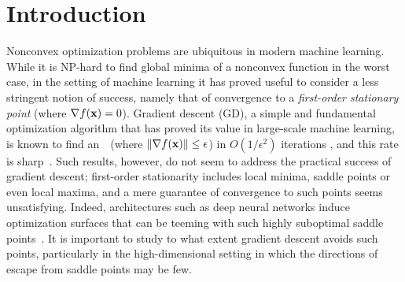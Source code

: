 
\section{Introduction}\label{sec:intro}


Nonconvex optimization problems are ubiquitous in modern machine learning. 
While it is NP-hard to find global minima of a nonconvex function in the worst case, 
in the setting of machine learning it has proved useful to consider a less stringent
notion of success, namely that of convergence to a \emph{first-order stationary point} 
(where $\nabla f(\mathbf{x}) = 0$).  Gradient descent (GD), a simple and fundamental 
optimization algorithm that has proved its value in large-scale machine learning, is 
known to find an~\EFSP ~(where $\left\|{\nabla f(\mathbf{x})}\right\| \le \epsilon$) in $O(1/\epsilon^2)$ 
iterations \citep{nesterov1998introductory}, and this rate is sharp~\citep{cartis2010complexity}. 
Such results, however, do not seem to address the practical success of gradient descent;
first-order stationarity includes local minima, saddle points or even local maxima, and a
mere guarantee of convergence to such points seems unsatisfying.  Indeed, architectures
such as deep neural networks induce optimization surfaces that can be teeming with such 
highly suboptimal saddle points~\citep{dauphin2014identifying}.  It is important to 
study to what extent gradient descent avoids such points, particularly in the high-dimensional
setting in which the directions of escape from saddle points may be few.


